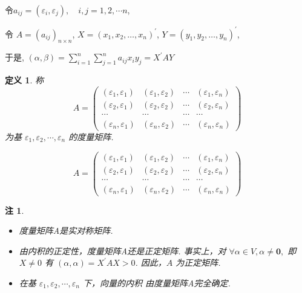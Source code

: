 \documentclass[13pt]{beamer}
\newtheorem*{defi}{定义}
\newtheorem*{rem}{注}
\begin{document}
\begin{frame}

令$ a_{i j}=\left(\varepsilon_{i}, \varepsilon_{j}\right), \quad i, j=1,2, \cdots n$, 

令
$A=\left(a_{i j} \right)_{n \times n}$,
$X= \left(x_1, x_2, \dots, x_n \right)^{\prime}$, 
$Y=\left(y_1, y_2, \dots, y_n \right)^{\prime}$,

于是,
$(\alpha, \beta)=\sum_{i=1}^{n} \sum_{j=1}^{n} a_{i j} x_{i} y_{j}=X^{\prime} A Y$

\begin{defi}
称$$A=
\left(\begin{array}{cccc}
\left(\varepsilon_{1}, \varepsilon_{1}\right) & \left(\varepsilon_{1}, \varepsilon_{2}\right) & \cdots & \left(\varepsilon_{1}, \varepsilon_{n}\right) \\ 
\left(\varepsilon_{2}, \varepsilon_{1}\right) & \left(\varepsilon_{2}, \varepsilon_{2}\right) & \cdots & \left(\varepsilon_{2}, \varepsilon_{n}\right) \\
\cdots & \cdots & \cdots & \cdots \\ 
\left(\varepsilon_{n}, \varepsilon_{1}\right)  & \left(\varepsilon_{n}, \varepsilon_{2}\right) & \cdots & \left(\varepsilon_{n}, \varepsilon_{n}\right)
\end{array}\right)$$
为基 $\varepsilon_{1}, \varepsilon_{2}, \cdots, \varepsilon_{n}$ 的度量矩阵.
\end{defi}


\end{frame}


\begin{frame}{}

$$A=
\left(\begin{array}{cccc}
\left(\varepsilon_{1}, \varepsilon_{1}\right) & \left(\varepsilon_{1}, \varepsilon_{2}\right) & \cdots & \left(\varepsilon_{1}, \varepsilon_{n}\right) \\ 
\left(\varepsilon_{2}, \varepsilon_{1}\right) & \left(\varepsilon_{2}, \varepsilon_{2}\right) & \cdots & \left(\varepsilon_{2}, \varepsilon_{n}\right) \\
 \cdots & \cdots & \cdots & \cdots \\ 
 \left(\varepsilon_{n}, \varepsilon_{1}\right)  & \left(\varepsilon_{n}, \varepsilon_{2}\right) & \cdots & \left(\varepsilon_{n}, \varepsilon_{n}\right)
\end{array}\right)$$

\begin{rem}
	\begin{itemize}
		\item 度量矩阵A是实对称矩阵.
		\item 由内积的正定性，度量矩阵A还是正定矩阵.
		事实上，对 $\forall \alpha \in V, \alpha \neq \mathbf{0},$ 即 $X \neq 0$
		有 $(\alpha, \alpha)=X^{\prime} A X>0$.
		因此，$ A$ 为正定矩阵.
		\item 在基 $\varepsilon_{1}, \varepsilon_{2}, \cdots, \varepsilon_{n}$ 下，向量的内积
		由度量矩阵A完全确定.
	\end{itemize}
\end{rem}

\end{frame}
\end{document}
